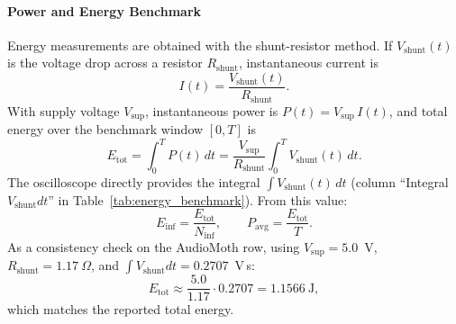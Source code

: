 \documentclass[a4paper,singleside,12pt]{report} %
\begin{document}
	\paragraph{Power and Energy Benchmark}
	Energy measurements are obtained with the shunt-resistor method. If \(V_{\mathrm{shunt}}(t)\) is the voltage drop across a resistor \(R_{\mathrm{shunt}}\), instantaneous current is
	\begin{equation}
		I(t)=\frac{V_{\mathrm{shunt}}(t)}{R_{\mathrm{shunt}}}.
	\end{equation}
	With supply voltage \(V_{\mathrm{sup}}\), instantaneous power is \(P(t)=V_{\mathrm{sup}}\,I(t)\), and total energy over the benchmark window \([0,T]\) is
	\begin{equation}
		E_{\mathrm{tot}}=\int_0^T P(t)\,dt=\frac{V_{\mathrm{sup}}}{R_{\mathrm{shunt}}}\int_0^T V_{\mathrm{shunt}}(t)\,dt.
	\end{equation}
	The oscilloscope directly provides the integral \(\int V_{\mathrm{shunt}}(t)\,dt\) (column ``Integral \(V_{\mathrm{shunt}}dt\)'' in Table~\ref{tab:energy_benchmark}). From this value:
	\begin{equation}
		E_{\mathrm{inf}}=\frac{E_{\mathrm{tot}}}{N_{\mathrm{inf}}},\qquad
		P_{\mathrm{avg}}=\frac{E_{\mathrm{tot}}}{T}.
	\end{equation}
	As a consistency check on the AudioMoth row, using \(V_{\mathrm{sup}}=5.0\)~V, \(R_{\mathrm{shunt}}=1.17~\Omega\), and \(\int V_{\mathrm{shunt}}dt=0.2707\)~V\,s:
	\[
		E_{\mathrm{tot}}\approx \frac{5.0}{1.17}\cdot 0.2707 = 1.1566~\mathrm{J},
	\]
	which matches the reported total energy.
\end{document}
